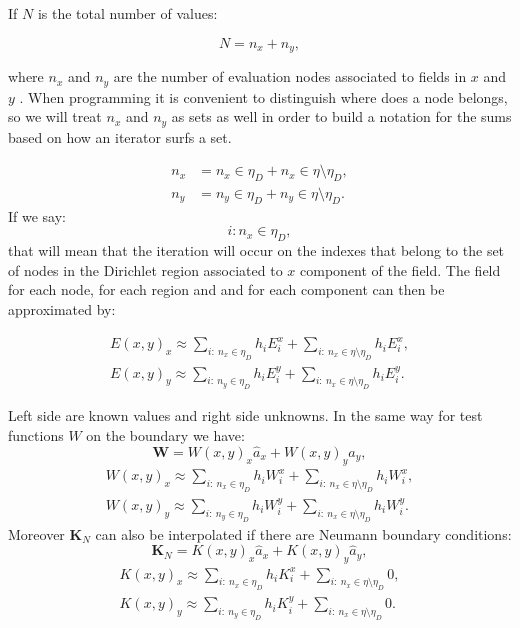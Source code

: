 If $N$ is the total number of values:

\[N = n_x + n_y,\]

where $n_x$ and $n_y$ are the number of evaluation nodes associated to fields in $x$ and  $y$	. When programming it is convenient to distinguish where does a node belongs, so we will treat $n_x$ and $n_y$ as sets as well in order to build a notation for the sums based on  how an iterator surfs a set.


\begin{align*}
n_x &= n_x \in \eta_D + n_x \in \eta\setminus\eta_D,\\
n_y &= n_y \in \eta_D + n_y \in \eta\setminus\eta_D.
\end{align*}
If we say: $$i: n_x\in \eta_D,$$  that will mean that the iteration will occur on the indexes that belong to the set of nodes in the Dirichlet region associated to $x$ component of the field. The field for each node, for each region and and for each component can then be approximated by:

\begin{align*}
E(x,y)_x\approx \sum_{i:\ n_x \in \eta_D} h_i E_i^x+\sum_{i:\ n_x \in \eta\setminus\eta_D} h_i E_i^x,\\
E(x,y)_y\approx \sum_{i:\ n_y \in \eta_D}h_iE_i^y+
\sum_{i:\ n_x \in \eta\setminus\eta_D}h_iE_i^y.
\end{align*}
 
Left side are known values and right side unknowns.
In the same way for test functions $W$ on the boundary we have: 
\[\mathbf{W}=W(x,y)_x\hat{a}_x + W(x,y)_y \hat{a}_y, \]
\begin{align*}
W(x,y)_x\approx \sum_{i:\ n_x \in \eta_D} h_i W_i^x+\sum_{i:\ n_x \in \eta\setminus\eta_D} h_i W_i^x, \\
W(x,y)_y\approx \sum_{i:\ n_y \in \eta_D}h_iW_i^y+
\sum_{i:\ n_x \in \eta\setminus\eta_D}h_iW_i^y.
\end{align*}
Moreover $\mathbf{K}_N$ can also be interpolated if there are Neumann boundary conditions: 
%
$$\mathbf{K}_N=K(x,y)_x\hat{a}_x + K(x,y)_y \hat{a}_y,$$
\begin{align*}
K(x,y)_x\approx \sum_{i:\ n_x \in \eta_D}h_i K_i^x+\sum_{i:\ n_x \in \eta\setminus\eta_D} 0, \\
K(x,y)_y\approx \sum_{i:\ n_y \in \eta_D}h_i K_i^y+
\sum_{i:\ n_x \in \eta\setminus\eta_D} 0.
\end{align*}

